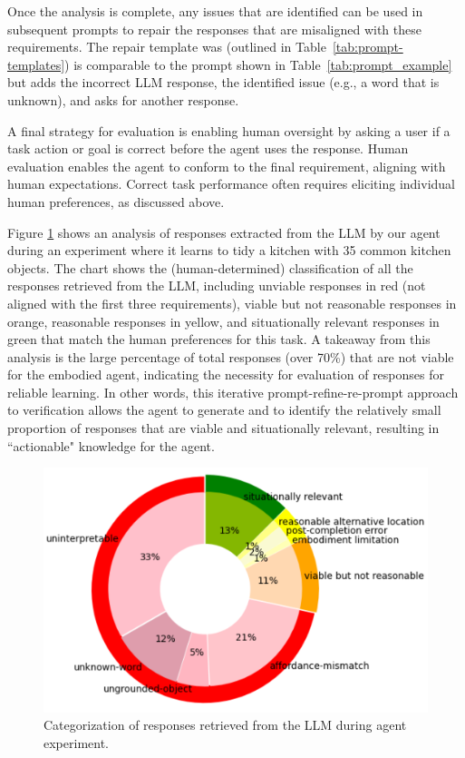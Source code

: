 \documentclass[letterpaper]{article} %
\begin{document}
Once the analysis is complete, any issues that are identified can be used in subsequent prompts to repair the responses that are misaligned with these requirements. The repair template was (outlined in Table~\ref{tab:prompt-templates}) is comparable to the prompt shown in Table~\ref{tab:prompt_example} but adds the incorrect LLM response, the identified issue (e.g., a word that is unknown), and asks for another response.

A final strategy for evaluation is enabling human oversight by asking a user if a task action or goal is correct before the agent uses the response. Human evaluation enables the agent to conform to the final requirement, aligning with human expectations. Correct task performance often requires eliciting individual human preferences, as discussed above.

Figure \ref{fig:response_categories} shows an analysis of responses extracted from the LLM by our agent during an experiment where it learns to tidy a kitchen with 35 common kitchen objects. The chart shows the (human-determined) classification of all the responses retrieved from the LLM, including unviable responses in red (not aligned with the first three requirements), viable but not reasonable responses in orange, reasonable responses in yellow, and situationally relevant responses in green that match the human preferences for this task. A takeaway from this analysis is the large percentage of total responses (over 70\%) that are not viable for the embodied agent, indicating the necessity for evaluation of responses for reliable learning. In other words, this iterative prompt-refine-re-prompt approach to verification allows the agent to generate and to identify the relatively small proportion of responses that are viable and situationally relevant, resulting in ``actionable" knowledge for the agent.

\begin{figure}[t]
\centering
\includegraphics[width=1.0\columnwidth]{figures/VerificationTypicalObjectsStandAloneResponseCategoriesSTARSManualCrop.png}
\caption{Categorization of responses retrieved from the LLM during agent experiment.}
\label{fig:response_categories}
\end{figure}
\end{document}
